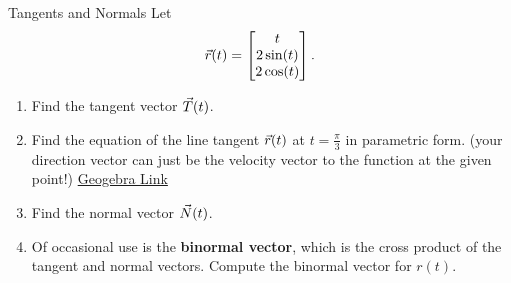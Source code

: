 \begin{exercise}{Tangents and Normals}\label{tandn}
Let $$\vec{r}(t)=\begin{bmatrix}t\\2\sin(t)\\2\cos(t)\end{bmatrix} .$$
\begin{enumerate}
\item Find the tangent vector $\vec{T}(t)$.
\vspace{1em}
\item Find the equation of the line tangent $\vec{r}(t)$ at $t=\frac{\pi}{3}$ in parametric form. (your direction vector can just be the velocity vector to the function at the given point!) \href{https://www.geogebra.org/3d/cngzwkaw}{Geogebra Link}
\vspace{1em}
\item Find the normal vector $\vec{N}(t)$.
\vspace{1em}
\item Of occasional use is the \textbf{binormal vector}, which is the cross product of the tangent and normal vectors. Compute the binormal vector for $r(t)$.
\end{enumerate}
\end{exercise}